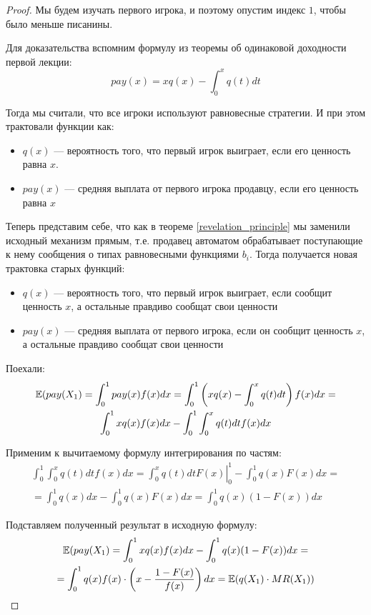 \begin{proof}
Мы будем изучать первого игрока, и поэтому опустим индекс $ 1 $, чтобы было меньше писанины.

Для доказательства вспомним формулу из теоремы об одинаковой доходности первой лекции:
\begin{equation}
pay(x)=xq(x)-\int_{0}^{x}q(t)dt 
\end{equation}

Тогда мы считали, что все игроки используют равновесные стратегии. И при этом трактовали функции как:

\begin{itemize}
\item $ q(x) $ --- вероятность того, что первый игрок выиграет, если его ценность равна $ x $.
\item $ pay(x) $ --- средняя выплата от первого игрока продавцу, если его ценность равна $ x $
\end{itemize}

Теперь представим себе, что как в теореме \ref{revelation_principle} мы заменили исходный механизм прямым, т.е. продавец автоматом обрабатывает поступающие к нему сообщения о типах равновесными функциями $ b_{i} $. Тогда получается новая трактовка старых функций:

\begin{itemize}
\item $ q(x) $ --- вероятность того, что первый игрок выиграет, если сообщит ценность $ x $, а остальные правдиво сообщат свои ценности
\item $ pay(x) $ --- средняя выплата от первого игрока, если он сообщит ценность $x$, а остальные правдиво сообщат свои ценности
\end{itemize}

Поехали:
\begin{multline}
\mathbb{E}(pay(X_{1})=\int_{0}^{1} pay(x)f(x)dx=\int_{0}^{1} \left( xq(x)-\int_{0}^{x}q(t)dt \right) f(x) dx=\\
\int_{0}^{1}xq(x)f(x)dx-\int_{0}^{1}\int_{0}^{x}q(t)dt f(x)dx
\end{multline}

Применим к вычитаемому формулу интегрирования по частям:
\begin{multline}
\int_{0}^{1}\int_{0}^{x}q(t)dt f(x)dx=\left. \int_{0}^{x}q(t)dt F(x)\right|_{0}^{1}-\int_{0}^{1}q(x)F(x)dx=\\
=\int_{0}^{1} q(x)dx-\int_{0}^{1}q(x)F(x)dx=\int_{0}^{1} q(x)(1-F(x))dx
\end{multline}

Подставляем полученный результат в исходную формулу:
\begin{multline}
\mathbb{E}(pay(X_{1})=\int_{0}^{1}xq(x)f(x)dx-\int_{0}^{1} q(x)(1-F(x))dx=\\
=\int_{0}^{1}q(x)f(x)\cdot \left(x-\frac{1-F(x)}{f(x)} \right)dx=\mathbb{E}(q(X_{1})\cdot MR(X_{1}))
\end{multline}
\end{proof}

